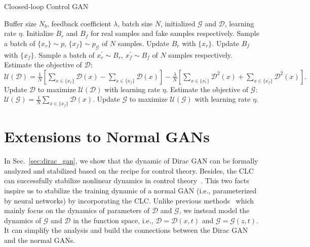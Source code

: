 \documentclass{article}
\newcommand{\xG}{\mathcal{G}}
\newcommand{\xD}{\mathcal{D}}
\newcommand{\uU}{\mathcal{U}}
\newcommand{\secref}[1]{Sec.~\ref{sec:#1}} \usepackage{wrapfig}
\theoremstyle{definition}
\begin{document}
\begin{algorithm}[t]
	\begin{algorithmic}[1]
\caption{Cloosed-loop Control GAN}\label{algo:NFGAN}
		 Buffer size $N_b$, feedback coefficient $\lambda$, batch size $N$, initialized $\xG$ and $\xD$, learning rate $\eta$.
		\STATE Initialize $B_r$ and $B_f$ for real samples and fake samples respectively.
		\REPEAT
		\STATE Sample a batch of $\{x_r\} \sim p$, $\{x_f\}\sim p_\xG$ of $N$ samples.
		\STATE Update $B_r$ with $\{x_r\}$. Update $B_f$ with $\{x_f\}$.
		\STATE Sample a batch of $x_r^\prime \sim B_r$, $x_f^\prime\sim B_f$ of $N$ samples respectively.
		\STATE Estimate the objective of $\xD$:\\
		$\uU(\xD)=\frac{1}{N}[\sum_{x\in\{x_r\}} \xD(x) - \sum_{x\in\{x_f\}} \xD(x)] - \frac{\lambda}{N}[\sum_{x\in\{x^\prime_r\}} \xD^2(x) + \sum_{x\in\{x^\prime_f\}} \xD^2(x)].$
		\STATE Update $\xD$ to maximize $\uU(\xD)$ with learning rate $\eta$.
		\STATE Estimate the objective of $\xG$:
		$\uU(\xG) = \frac{1}{N}\sum_{x\in\{x_f\}} \xD(x)$.
		\STATE Update $\xG$ to maximize $\uU(\xG)$ with learning rate $\eta$.
	\end{algorithmic}
\end{algorithm}

\section{Extensions to Normal GANs}\label{sec:normal_gan}


In \secref{dirac_gan}, we show that the dynamic of Dirac GAN can be formally analyzed and stabilized based on the recipe for control theory.
Besides, the CLC can successfully stabilize nonlinear dynamics in control theory~\cite{khalil2002nonlinear}.
This two facts inspire us to stabilize the training dynamic of a normal GAN (i.e., parameterized by neural networks) by incorporating the CLC.
Unlike previous methods~\cite{mescheder2018training} which mainly focus on the dynamics of parameters of $\xD$ and $\xG$, we instead model the dynamics of $\xG$ and $\xD$ in the function space, i.e., $\xD = \xD(x, t)$ and $\xG = \xG(z, t)$. It can simplify the analysis and build the connections between the Dirac GAN and the normal GANs.
\end{document}
